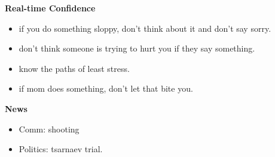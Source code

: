 \documentclass[11pt]{article}
\begin{document}
{            %
            \textbf{Real-time Confidence}\\
            \begin{itemize}
              \tiny \item \tiny if you do something sloppy, don't
              think about it and don't say sorry.
            \item \tiny don't think someone is trying to hurt you if
              they say something.
            \item \tiny know the paths of least stress.
            \item \tiny if mom does something, don't let that bite
              you. 
            \end{itemize} 
            \textbf{News} 
            \begin{itemize} 
            \item \tiny Comm: shooting 
            \item \tiny Politics: tsarnaev trial. 
            \end{itemize} 
    
}
\end{document}
